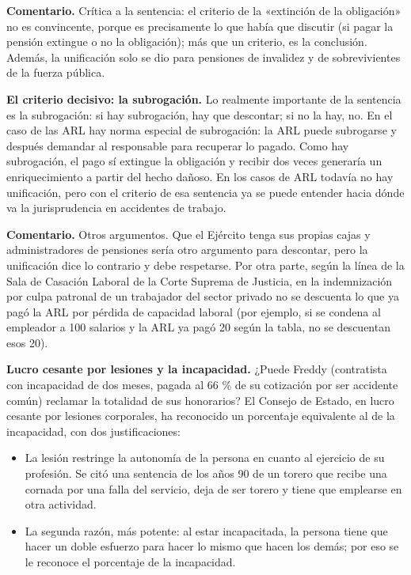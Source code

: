 \begin{comentario}
\textcolor[HTML]{8A6D3B}{\textbf{Comentario. }}Crítica a la sentencia: el criterio de la «extinción de la obligación» no es convincente, porque es precisamente lo que había que discutir (si pagar la pensión extingue o no la obligación); más que un criterio, es la conclusión. Además, la unificación solo se dio para pensiones de invalidez y de sobrevivientes de la fuerza pública.
\end{comentario}
\textbf{El criterio decisivo: la subrogación.} Lo realmente importante de la sentencia es la subrogación: si hay subrogación, hay que descontar; si no la hay, no. En el caso de las ARL hay norma especial de subrogación: la ARL puede subrogarse y después demandar al responsable para recuperar lo pagado. Como hay subrogación, el pago sí extingue la obligación y recibir dos veces generaría un enriquecimiento a partir del hecho dañoso. En los casos de ARL todavía no hay unificación, pero con el criterio de esa sentencia ya se puede entender hacia dónde va la jurisprudencia en accidentes de trabajo.

\begin{comentario}
\textcolor[HTML]{8A6D3B}{\textbf{Comentario. }}Otros argumentos. Que el Ejército tenga sus propias cajas y administradores de pensiones sería otro argumento para descontar, pero la unificación dice lo contrario y debe respetarse. Por otra parte, según la línea de la Sala de Casación Laboral de la Corte Suprema de Justicia, en la indemnización por culpa patronal de un trabajador del sector privado no se descuenta lo que ya pagó la ARL por pérdida de capacidad laboral (por ejemplo, si se condena al empleador a 100 salarios y la ARL ya pagó 20 según la tabla, no se descuentan esos 20).
\end{comentario}
\textbf{Lucro cesante por lesiones y la incapacidad.} ¿Puede Freddy (contratista con incapacidad de dos meses, pagada al 66 \% de su cotización por ser accidente común) reclamar la totalidad de sus honorarios? El Consejo de Estado, en lucro cesante por lesiones corporales, ha reconocido un porcentaje equivalente al de la incapacidad, con dos justificaciones:

\begin{itemize}
\item La lesión restringe la autonomía de la persona en cuanto al ejercicio de su profesión. Se citó una sentencia de los años 90 de un torero que recibe una cornada por una falla del servicio, deja de ser torero y tiene que emplearse en otra actividad.
\item La segunda razón, más potente: al estar incapacitada, la persona tiene que hacer un doble esfuerzo para hacer lo mismo que hacen los demás; por eso se le reconoce el porcentaje de la incapacidad.
\end{itemize}
